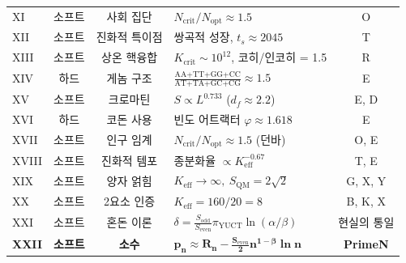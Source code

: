 \documentclass[12pt,a4paper]{article}
\begin{document}
\begin{table}[htbp]
\begin{tabular}{l c c p{3.8cm} c}
			XI  & 소프트 & 사회 집단 & \(N_{\mathrm{crit}}/N_{\mathrm{opt}} \approx 1.5\) & O \\
			XII & 소프트 & 진화적 특이점 & 쌍곡적 성장, \(t_s \approx 2045\) & T \\
			XIII& 소프트 & 상온 핵융합 & \(K_{\mathrm{crit}} \sim 10^{12}\), 코히/인코히 = 1.5 & R \\
			XIV & 하드 & 게놈 구조 & \(\frac{\text{AA+TT+GG+CC}}{\text{AT+TA+GC+CG}} \approx 1.5\) & E \\
			XV  & 소프트 & 크로마틴 & \(S \propto L^{0.733}\) (\(d_f \approx 2.2\)) & E, D \\
			XVI & 하드 & 코돈 사용 & 빈도 어트랙터 \(\varphi \approx 1.618\) & E \\
			XVII& 소프트 & 인구 임계 & \(N_{\mathrm{crit}}/N_{\mathrm{opt}} \approx 1.5\) (던바) & O, E \\
			XVIII&소프트 & 진화적 템포 & 종분화율 \(\propto K_{\mathrm{eff}}^{-0.67}\) & T, E \\
			XIX & 소프트 & 양자 얽힘 & \(K_{\mathrm{eff}} \to \infty,\ S_{\mathrm{QM}} = 2\sqrt{2}\) & G, X, Y \\
			XX  & 소프트 & 2요소 인증 & \(K_{\mathrm{eff}} = 160/20 = 8\) & B, K, X \\
			XXI & 소프트 & 혼돈 이론 & \(\delta = \frac{S_{\mathrm{odd}}}{S_{\mathrm{even}}} \pi_{\mathrm{YUCT}} \ln(\alpha/\beta)\) & 현실의 통일 \\
			\textbf{XXII} & \textbf{소프트} & \textbf{소수} & \(\mathbf{p_n \approx R_n - \frac{S_{\mathrm{even}}}{2}n^{1-\beta}\ln n}\) & \textbf{PrimeN} \\
			\bottomrule
		\end{tabular}
	\end{table}
	
\end{document}
